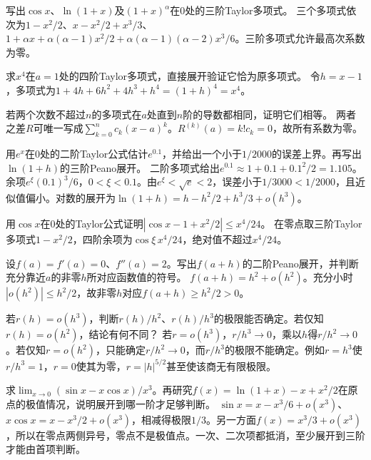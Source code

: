 写出\(\cos x\)、\(\ln(1+x)\)及\((1+x)^\alpha\)在\(0\)处的三阶Taylor多项式。
\solutionanswer
三个多项式依次为\(1-x^2/2\)、\(x-x^2/2+x^3/3\)、\(1+\alpha x+\alpha(\alpha-1)x^2/2+\alpha(\alpha-1)(\alpha-2)x^3/6\)。三阶多项式允许最高次系数为零。


求\(x^4\)在\(a=1\)处的四阶Taylor多项式，直接展开验证它恰为原多项式。
\solutionanswer
令\(h=x-1\)，多项式为\(1+4h+6h^2+4h^3+h^4=(1+h)^4=x^4\)。


若两个次数不超过\(n\)的多项式在\(a\)处直到\(n\)阶的导数都相同，证明它们相等。
\solutionanswer
两者之差\(R\)可唯一写成\(\sum_{k=0}^nc_k(x-a)^k\)。\(R^{(k)}(a)=k!c_k=0\)，故所有系数为零。


用\(e^x\)在\(0\)处的二阶Taylor公式估计\(e^{0.1}\)，并给出一个小于\(1/2000\)的误差上界。再写出\(\ln(1+h)\)的三阶Peano展开。
\solutionanswer
二阶多项式给出\(e^{0.1}\approx1+0.1+0.1^2/2=1.105\)。余项\(e^\xi(0.1)^3/6\)，\(0<\xi<0.1\)。由\(e^\xi<\sqrt e<2\)，误差小于\(1/3000<1/2000\)，且近似值偏小。对数的展开为\(\ln(1+h)=h-h^2/2+h^3/3+o(h^3)\)。


用\(\cos x\)在\(0\)处的Taylor公式证明\(|\cos x-1+x^2/2|\le x^4/24\)。
\solutionanswer
在零点取三阶Taylor多项式\(1-x^2/2\)，四阶余项为\(\cos\xi\,x^4/24\)，绝对值不超过\(x^4/24\)。


设\(f(a)=f'(a)=0\)、\(f''(a)=2\)。写出\(f(a+h)\)的二阶Peano展开，并判断充分靠近\(a\)的非零\(h\)所对应函数值的符号。
\solutionanswer
\(f(a+h)=h^2+o(h^2)\)。充分小时\(|o(h^2)|\le h^2/2\)，故非零\(h\)对应\(f(a+h)\ge h^2/2>0\)。


若\(r(h)=o(h^3)\)，判断\(r(h)/h^2\)、\(r(h)/h^3\)的极限能否确定。若仅知\(r(h)=o(h^2)\)，结论有何不同？
\solutionanswer
若\(r=o(h^3)\)，\(r/h^3\to0\)，乘以\(h\)得\(r/h^2\to0\)。若仅知\(r=o(h^2)\)，只能确定\(r/h^2\to0\)，而\(r/h^3\)的极限不能确定。例如\(r=h^3\)使\(r/h^3=1\)，\(r=0\)使其为零，\(r=|h|^{5/2}\)甚至使该商无有限极限。


求\(\lim_{x\to0}(\sin x-x\cos x)/x^3\)。再研究\(f(x)=\ln(1+x)-x+x^2/2\)在原点的极值情况，说明展开到哪一阶才足够判断。
\solutionanswer
\(\sin x=x-x^3/6+o(x^3)\)、\(x\cos x=x-x^3/2+o(x^3)\)，相减得极限\(1/3\)。另一方面\(f(x)=x^3/3+o(x^3)\)，所以在零点两侧异号，零点不是极值点。一次、二次项都抵消，至少展开到三阶才能由首项判断。



